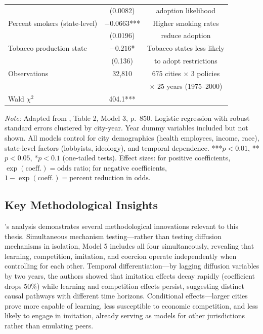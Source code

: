 \documentclass[12pt]{report}
\begin{document}
\begin{table}[htbp]
\begin{tabular}{lcc}
& (0.0082) & adoption likelihood \\
Percent smokers (state-level) & $-0.0663$*** & Higher smoking rates \\
& (0.0196) & reduce adoption \\
Tobacco production state & $-0.216$* & Tobacco states less likely \\
& (0.136) & to adopt restrictions \\
\addlinespace
\midrule
Observations & 32,810 & 675 cities $\times$ 3 policies \\
& & $\times$ 25 years (1975--2000) \\
Wald $\chi^2$ & 404.1*** & \\
\bottomrule
\end{tabular}
\vspace{0.5em}
\begin{minipage}{\linewidth}
\small\textit{Note:} Adapted from \textcite{shipanMechanismsPolicyDiffusion2008a}, Table 2, Model 3, p.~850.
Logistic regression with robust standard errors clustered by city-year. Year dummy variables
included but not shown. All models control for city demographics (health employees, income, race),
state-level factors (lobbyists, ideology), and temporal dependence.
***$p < 0.01$, **$p < 0.05$, *$p < 0.1$ (one-tailed tests). Effect sizes: for positive
coefficients, $\exp(\text{coeff.}) = \text{odds ratio}$; for negative coefficients,
$1 - \exp(\text{coeff.}) = \text{percent reduction in odds}$.
\end{minipage}
\end{table}

\subsection*{Key Methodological Insights}

\textcite{shipanMechanismsPolicyDiffusion2008a}'s analysis demonstrates several methodological innovations
relevant to this thesis. Simultaneous mechanism testing---rather than testing diffusion mechanisms
in isolation, Model 5 includes all four simultaneously, revealing that learning, competition,
imitation, and coercion operate independently when controlling for each other. Temporal
differentiation---by lagging diffusion variables by two years, the authors showed that imitation
effects decay rapidly (coefficient drops 50\%) while learning and competition effects persist,
suggesting distinct causal pathways with different time horizons. Conditional effects---larger
cities prove more capable of learning, less susceptible to economic competition, and less likely
to engage in imitation, already serving as models for other jurisdictions rather than emulating
peers.
\end{document}
